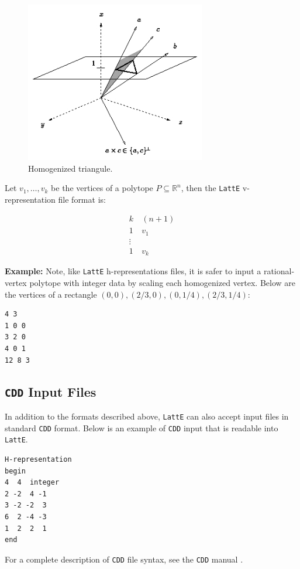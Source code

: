 \documentclass{article}
\newcommand{\R}{{\mathbb R}}
\newcommand{\latte}{{\tt LattE}\xspace}
\newcommand{\cdd}{{\tt CDD}\xspace}
\newcommand{\example}{{\bf Example:\space}}
\begin{document}
\begin{figure}
\centering
\includegraphics[width=0.7\textwidth]{homogenizedTriangle.jpg}
\caption{Homogenized triangule.}
\label{fig:homogenized-triangle}
\end{figure}


Let $v_1, \dots, v_k$ be the vertices of a polytope $P \subseteq \R^n$, then the \latte v-representation file format is:

\begin{align*}
	k &\: (n+1)\\
	1 &\: v_1\\
	\vdots & \\
	1 &\: v_k
\end{align*}


\example
Note, like \latte h-representations files, it is safer to input a rational-vertex polytope with integer data by scaling each homogenized vertex. Below are the vertices of a rectangle $(0,0), (2/3,0), (0,1/4), (2/3, 1/4)$:
\begin{verbatim}
4 3
1 0 0
3 2 0
4 0 1
12 8 3
\end{verbatim}

\subsection{\cdd Input Files}
In addition to the formats described above, {\tt LattE} can also
accept input files in standard \cdd format. Below is
an example of \cdd input that is readable into \latte.
\begin{verbatim}
H-representation
begin
4  4  integer
2 -2  4 -1
3 -2 -2  3
6  2 -4 -3
1  2  2  1
end
\end{verbatim}

For a complete description of \cdd file syntax, see the \cdd manual \cite{fukuda}.
\end{document}
